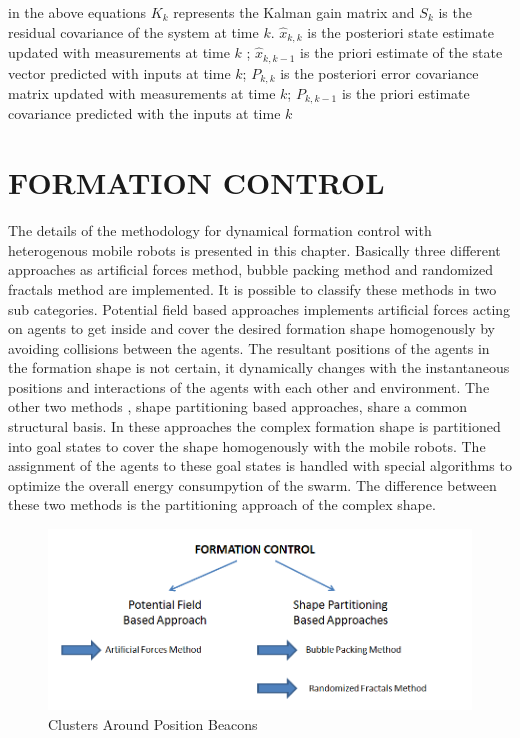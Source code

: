 in the above equations $K_k$ represents the Kalman gain matrix and $S_k$ is the residual covariance of the system at time $k$. $\hat{x}_{k,k}$ is the posteriori state estimate updated with measurements at time $k$ ;  $\hat{x}_{k,k-1}$ is the priori estimate of the state vector predicted with inputs at time $k$; $P_{k,k}$ is the posteriori error covariance matrix updated with measurements at time $k$; $P_{k,k-1}$ is the priori estimate covariance predicted with the inputs at time $k$
			
\section{FORMATION CONTROL}		
The details of the methodology for dynamical formation control with heterogenous mobile robots is presented in this chapter. Basically three different approaches as artificial forces method, bubble packing method and randomized fractals method are implemented. It is possible to classify these methods in two sub categories. Potential field based approaches implements artificial forces acting on agents to get inside and cover the desired formation shape homogenously by avoiding collisions between the agents. The resultant positions of the agents in the formation shape is not certain, it dynamically changes with the instantaneous positions and interactions of the agents with each other and environment. The other two methods , shape partitioning based approaches, share a common structural basis. In these approaches the complex formation shape is partitioned into goal states to cover the shape homogenously with the mobile robots. The assignment of the agents to these goal states is handled with special algorithms to optimize the overall energy consumpytion of the swarm. The difference between these two methods is the partitioning approach of the complex shape. 
		
\begin{figure}[H]
\caption{Clusters Around Position Beacons}
\centering
\includegraphics[scale = 0.60]{methods}
\end{figure}		
		
